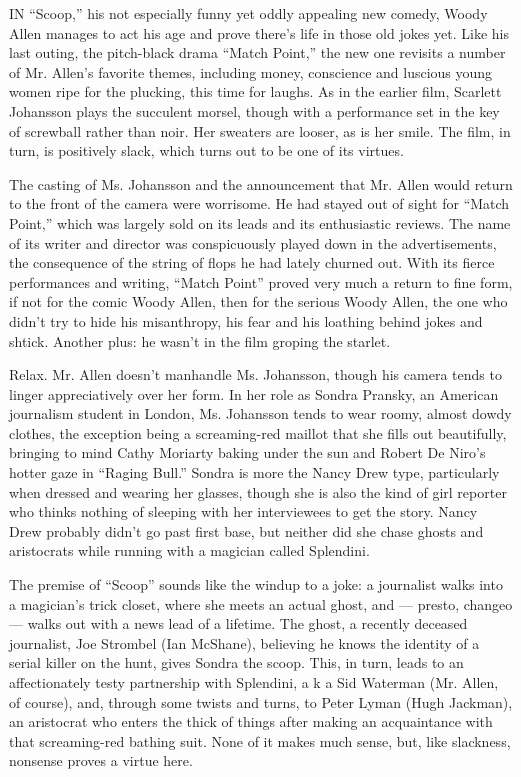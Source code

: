 IN ``Scoop,'' his not especially funny yet oddly appealing new comedy,
Woody Allen manages to act his age and prove there's life in those old
jokes yet. Like his last outing, the pitch-black drama ``Match Point,''
the new one revisits a number of Mr. Allen's favorite themes, including
money, conscience and luscious young women ripe for the plucking, this
time for laughs. As in the earlier film, Scarlett Johansson plays the
succulent morsel, though with a performance set in the key of screwball
rather than noir. Her sweaters are looser, as is her smile. The film, in
turn, is positively slack, which turns out to be one of its virtues.

The casting of Ms. Johansson and the announcement that Mr. Allen would
return to the front of the camera were worrisome. He had stayed out of
sight for ``Match Point,'' which was largely sold on its leads and its
enthusiastic reviews. The name of its writer and director was
conspicuously played down in the advertisements, the consequence of the
string of flops he had lately churned out. With its fierce performances
and writing, ``Match Point'' proved very much a return to fine form, if
not for the comic Woody Allen, then for the serious Woody Allen, the one
who didn't try to hide his misanthropy, his fear and his loathing behind
jokes and shtick. Another plus: he wasn't in the film groping the
starlet.

Relax. Mr. Allen doesn't manhandle Ms. Johansson, though his camera
tends to linger appreciatively over her form. In her role as Sondra
Pransky, an American journalism student in London, Ms. Johansson tends
to wear roomy, almost dowdy clothes, the exception being a screaming-red
maillot that she fills out beautifully, bringing to mind Cathy Moriarty
baking under the sun and Robert De Niro's hotter gaze in ``Raging
Bull.'' Sondra is more the Nancy Drew type, particularly when dressed
and wearing her glasses, though she is also the kind of girl reporter
who thinks nothing of sleeping with her interviewees to get the story.
Nancy Drew probably didn't go past first base, but neither did she chase
ghosts and aristocrats while running with a magician called Splendini.

The premise of ``Scoop'' sounds like the windup to a joke: a journalist
walks into a magician's trick closet, where she meets an actual ghost,
and --- presto, changeo --- walks out with a news lead of a lifetime.
The ghost, a recently deceased journalist, Joe Strombel (Ian McShane),
believing he knows the identity of a serial killer on the hunt, gives
Sondra the scoop. This, in turn, leads to an affectionately testy
partnership with Splendini, a k a Sid Waterman (Mr. Allen, of course),
and, through some twists and turns, to Peter Lyman (Hugh Jackman), an
aristocrat who enters the thick of things after making an acquaintance
with that screaming-red bathing suit. None of it makes much sense, but,
like slackness, nonsense proves a virtue here.

